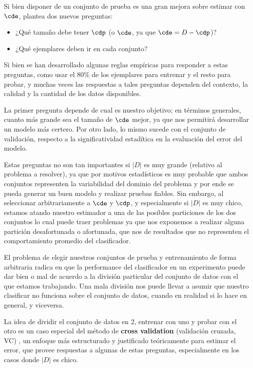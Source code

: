 
Si bien disponer de un conjunto de prueba es una gran mejora sobre estimar con $\cde$, plantea dos nuevos preguntas:

\begin{itemize}
\item ¿Qué tamaño debe tener $\cdp$ (o $\cde$, ya que $\cde = D - \cdp$)?
\item ¿Qué ejemplares deben ir en cada conjunto? 
\end{itemize}

Si bien se han desarrollado algunas reglas empíricas para responder a estas preguntas, como usar el 80\% de los ejemplares para entrenar y el resto para probar, y muchas veces las respuestas a tales preguntas dependen del contexto, la calidad y la cantidad de los datos disponibles. 

La primer pregunta depende de cual es nuestro objetivo; en términos generales, cuanto más grande sea el tamaño de $\cde$ mejor, ya que nos permitirá desarrollar un modelo más certero. Por otro lado, lo mismo sucede con el conjunto de validación, respecto a la significatividad estadítica en la evaluación del error del modelo.

Estas preguntas no son tan importantes si $|D|$ es muy grande (relativo al problema a resolver), ya que por motivos estadísticos es muy probable que ambos conjuntos representen la variabilidad del dominio del problema y por ende se pueda generar un buen modelo y realizar pruebas fiables. Sin embargo, al seleccionar arbitrariamente a $\cde$ y $\cdp$, y especialmente si $|D|$ es muy chico, estamos atando nuestro estimador a una de las posibles particiones de los dos conjuntos lo cual puede traer problemas ya que nos exponemos a realizar alguna partición desafortunada o afortunada, que nos de resultados que no representen el comportamiento promedio del clasificador.

El problema de elegir nuestros conjuntos de prueba y entrenamiento de forma arbitraria radica en que la performance del clasificador en un experimento puede dar bien o mal de acuerdo a la división particular del conjunto de datos con el que estamos trabajando. Una mala división nos puede llevar a asumir que nuestro clasificar no funciona sobre el conjunto de datos, cuando en realidad si lo hace en general, y viceversa.

La idea de dividir el conjunto de datos en 2, entrenar con uno y probar con el otro es un caso especial del método de \textbf{cross validation} (validación cruzada, VC) \cite{refaeilzadeh2009}, un enfoque más estructurado y justificado teóricamente para estimar el error, que provee respuestas a algunas de estas preguntas, especialmente en los casos donde $|D|$ es chico. 

